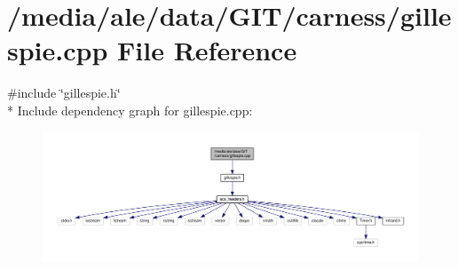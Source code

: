 \hypertarget{a00031}{\section{/media/ale/data/\-G\-I\-T/carness/gillespie.cpp File Reference}
\label{a00031}
}
{\ttfamily \#include \char`\"{}gillespie.\-h\char`\"{}}\\*
Include dependency graph for gillespie.\-cpp\-:\nopagebreak
\begin{figure}[H]
\begin{center}
\leavevmode
\includegraphics[width=350pt]{a00061}
\end{center}
\end{figure}
